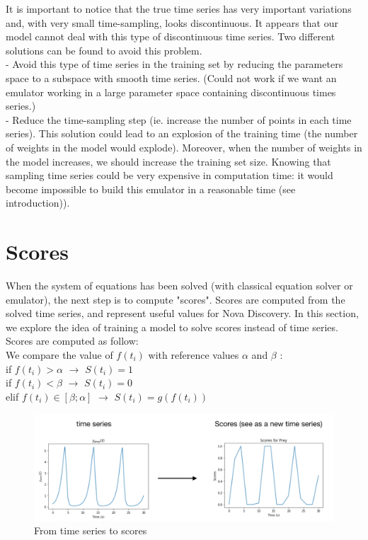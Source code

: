 \documentclass{article}
\begin{document}
It is important to notice that the true time series has very important variations and, with very small time-sampling, looks discontinuous. It appears that our model cannot deal with this type of discontinuous time series. Two different solutions can be found to avoid this problem. \\
- Avoid this type of time series in the training set by reducing the parameters space to a subspace with smooth time series. (Could not work if we want an emulator working in a large parameter space containing discontinuous times series.)  \\
- Reduce the time-sampling step (ie. increase the number of points in each time series). This solution could lead to an explosion of the training time (the number of weights in the model would explode). Moreover, when the number of weights in the model increases, we should increase the training set size. Knowing that sampling time series could be very expensive in computation time: it would become impossible to build this emulator in a reasonable time (see introduction)).  




\section{Scores}

When the system of equations has been solved (with classical equation solver or emulator), the next step is to compute "scores". Scores are computed from the solved time series, and represent useful values for Nova Discovery. In this section, we explore the idea of training a model to solve scores instead of time series.   \\

Scores are computed as follow: \\

We compare the value of $f(t_i)$ with reference values $\alpha$ and $\beta$ : \\
if $f(t_i) > \alpha$  $\to$ $S(t_i) = 1$\\
if $f(t_i) < \beta$  $\to$ $S(t_i) = 0$ \\ 
elif $f(t_i) \in [\beta ; \alpha] $ $\to $ $S(t_i) = g(f(t_i))$ 


\begin{figure}[H]
\centering
\includegraphics[scale=0.6]{image/time_serie_vs_scores.png}
\caption{From time series to scores}
\label{fig: time_ series to score}
\end{figure}
\end{document}
